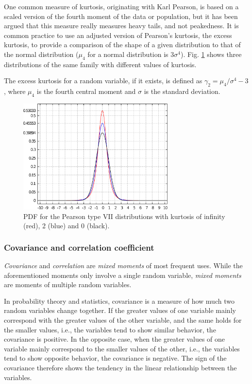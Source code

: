 One common measure of kurtosis, originating with Karl Pearson, is based on a scaled version of the fourth moment of the data or population, but it has been argued that this measure really measures heavy tails, and not peakedness. It is common practice to use an adjusted version of Pearson's kurtosis, the excess kurtosis, to provide a comparison of the shape of a given distribution to that of the normal distribution ($ \mu_4 $ for a normal distribution is $ 3\sigma^4 $). Fig. \ref{fig:ch1_kurtosis} shows three distributions of the same family with different values of kurtosis. 

\begin{defn}
The excess kurtosis for a random variable, if it exists, is defined as $ \gamma_2 = \mu_4 / \sigma^4 -3 $, where $ \mu_4 $ is the fourth central moment and $ \sigma $ is the standard deviation.
\end{defn}

\begin{figure}[!h]
\begin{center}
\includegraphics[width=0.7\textwidth]{figures/ch1_kurtosis.eps}
\caption{PDF for the Pearson type VII distributions with kurtosis of infinity (red), 2 (blue) and 0 (black). }
\label{fig:ch1_kurtosis}
\end{center}
\end{figure}

\subsubsection{Covariance and correlation coefficient}
\textit{Covariance} and \textit{correlation} are \textit{mixed moments} of most frequent uses. While the aforementioned moments only involve a single random variable, \textit{mixed moments} are moments of multiple random variables. 

In probability theory and statistics, covariance is a measure of how much two random variables change together. If the greater values of one variable mainly correspond with the greater values of the other variable, and the same holds for the smaller values, i.e., the variables tend to show similar behavior, the covariance is positive. In the opposite case, when the greater values of one variable mainly correspond to the smaller values of the other, i.e., the variables tend to show opposite behavior, the covariance is negative. The sign of the covariance therefore shows the tendency in the linear relationship between the variables.

